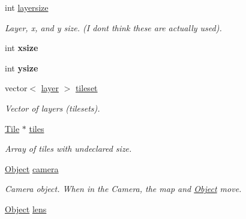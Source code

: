 \begin{DoxyCompactItemize}
\item 
int \hyperlink{classTileset_ae8f918235d7a593c27902453100ba346}{layersize}\hypertarget{classTileset_ae8f918235d7a593c27902453100ba346}{}\label{classTileset_ae8f918235d7a593c27902453100ba346}

\begin{DoxyCompactList}\small\item\em Layer, x, and y size. (I don\textquotesingle{}t think these are actually used). \end{DoxyCompactList}\item 
int {\bfseries xsize}\hypertarget{classTileset_ab2e6d05b755a0ef6a6553f0e0a927bb2}{}\label{classTileset_ab2e6d05b755a0ef6a6553f0e0a927bb2}

\item 
int {\bfseries ysize}\hypertarget{classTileset_a01c8ff51bb30ce67abaea923e3f872d9}{}\label{classTileset_a01c8ff51bb30ce67abaea923e3f872d9}

\item 
vector$<$ \hyperlink{structTileset_1_1layer}{layer} $>$ \hyperlink{classTileset_a81af66347f72322f800deb3c149f23f7}{tileset}\hypertarget{classTileset_a81af66347f72322f800deb3c149f23f7}{}\label{classTileset_a81af66347f72322f800deb3c149f23f7}

\begin{DoxyCompactList}\small\item\em Vector of layers (tilesets). \end{DoxyCompactList}\item 
\hyperlink{classTile}{Tile} $\ast$ \hyperlink{classTileset_ad8d83e4d7659ba7e3a2b4ea5670ea351}{tiles}\hypertarget{classTileset_ad8d83e4d7659ba7e3a2b4ea5670ea351}{}\label{classTileset_ad8d83e4d7659ba7e3a2b4ea5670ea351}

\begin{DoxyCompactList}\small\item\em Array of tiles with undeclared size. \end{DoxyCompactList}\item 
\hyperlink{classObject}{Object} \hyperlink{classTileset_a66a6f99c17241db7156403f4a9db24a6}{camera}\hypertarget{classTileset_a66a6f99c17241db7156403f4a9db24a6}{}\label{classTileset_a66a6f99c17241db7156403f4a9db24a6}

\begin{DoxyCompactList}\small\item\em Camera object. When in the Camera, the map and \hyperlink{classObject}{Object} move. \end{DoxyCompactList}\item 
\hyperlink{classObject}{Object} \hyperlink{classTileset_a74e38c7eaa26c431a7d9e7852072954f}{lens}\hypertarget{classTileset_a74e38c7eaa26c431a7d9e7852072954f}{}\label{classTileset_a74e38c7eaa26c431a7d9e7852072954f}


\end{DoxyCompactItemize}
